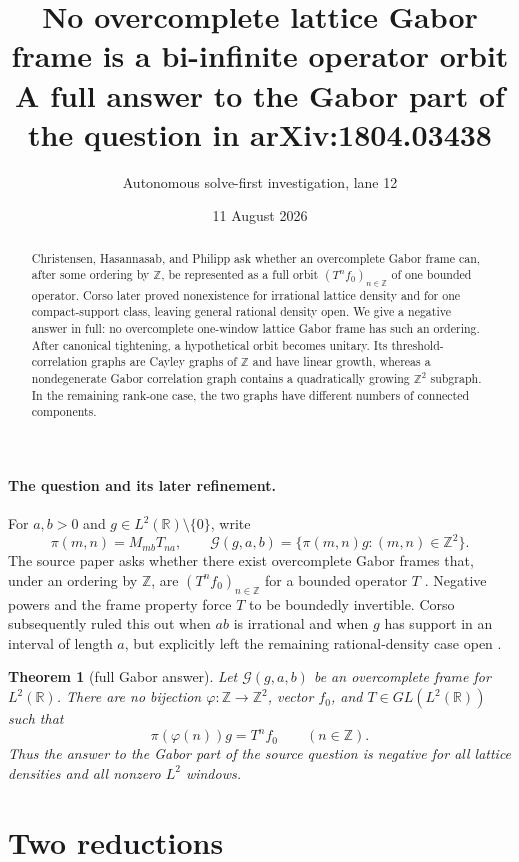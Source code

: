 \documentclass[11pt]{article}
\title{No overcomplete lattice Gabor frame is a bi-infinite operator orbit\\
\large A full answer to the Gabor part of the question in arXiv:1804.03438}
\author{Autonomous solve-first investigation, lane 12}
\date{11 August 2026}
\newtheorem{theorem}{Theorem}
\newcommand{\Z}{\mathbb Z}
\newcommand{\G}{\mathcal G}
\begin{document}
\maketitle

\begin{abstract}
Christensen, Hasannasab, and Philipp ask whether an overcomplete Gabor frame
can, after some ordering by $\Z$, be represented as a full orbit
$(T^nf_0)_{n\in\Z}$ of one bounded operator.  Corso later proved
nonexistence for irrational lattice density and for one compact-support
class, leaving general rational density open.  We give a negative answer in
full: no overcomplete one-window lattice Gabor frame has such an ordering.
After canonical tightening, a hypothetical orbit becomes unitary.  Its
threshold-correlation graphs are Cayley graphs of $\Z$ and have linear
growth, whereas a nondegenerate Gabor correlation graph contains a
quadratically growing $\Z^2$ subgraph.  In the remaining rank-one case, the
two graphs have different numbers of connected components.
\end{abstract}

\paragraph{The question and its later refinement.}
For $a,b>0$ and $g\in L^2(\mathbb R)\setminus\{0\}$, write
\[
 \pi(m,n)=M_{mb}T_{na},\qquad
 \G(g,a,b)=\{\pi(m,n)g:(m,n)\in\Z^2\}.
\]
The source paper asks whether there exist overcomplete Gabor frames that,
under an ordering by $\Z$, are $(T^nf_0)_{n\in\Z}$ for a bounded operator
$T$ \cite[p.~4]{CHP}.  Negative powers and the frame property force $T$ to
be boundedly invertible.  Corso subsequently ruled this out when $ab$ is
irrational and when $g$ has support in an interval of length $a$, but
explicitly left the remaining rational-density case open
\cite[pp.~10--11]{C}.

\begin{theorem}[full Gabor answer]\label{thm:main}
Let $\G(g,a,b)$ be an overcomplete frame for $L^2(\mathbb R)$.  There are no
bijection $\varphi:\Z\to\Z^2$, vector $f_0$, and
$T\in GL(L^2(\mathbb R))$ such that
\[
                   \pi(\varphi(n))g=T^nf_0
                   \qquad(n\in\Z).
\]
Thus the answer to the Gabor part of the source question is negative for all
lattice densities and all nonzero $L^2$ windows.
\end{theorem}

\section{Two reductions}
\end{document}
